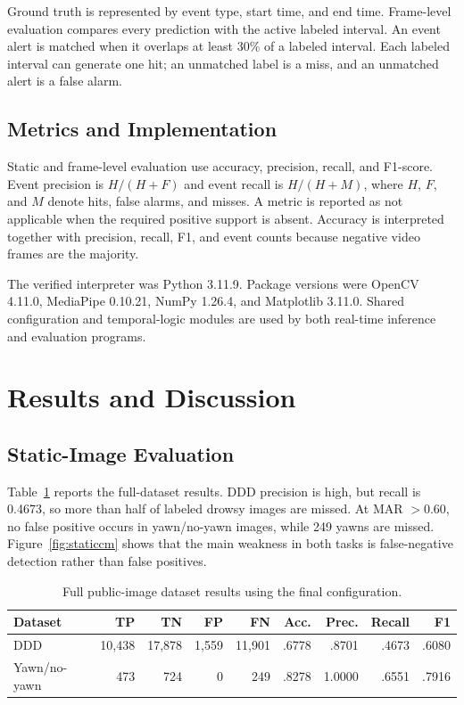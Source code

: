 \documentclass[runningheads]{llncs}
\begin{document}
Ground truth is represented by event type, start time, and end time. Frame-level
evaluation compares every prediction with the active labeled interval. An event
alert is matched when it overlaps at least 30\% of a labeled interval. Each
labeled interval can generate one hit; an unmatched label is a miss, and an
unmatched alert is a false alarm.

\subsection{Metrics and Implementation}

Static and frame-level evaluation use accuracy, precision, recall, and F1-score.
Event precision is $H/(H+F)$ and event recall is $H/(H+M)$, where $H$, $F$, and
$M$ denote hits, false alarms, and misses. A metric is reported as not applicable
when the required positive support is absent. Accuracy is interpreted together
with precision, recall, F1, and event counts because negative video frames are
the majority.

The verified interpreter was Python 3.11.9. Package versions were OpenCV
4.11.0, MediaPipe 0.10.21, NumPy 1.26.4, and Matplotlib 3.11.0. Shared
configuration and temporal-logic modules are used by both real-time inference
and evaluation programs.

\section{Results and Discussion}

\subsection{Static-Image Evaluation}

Table~\ref{tab:static} reports the full-dataset results. DDD precision is high,
but recall is 0.4673, so more than half of labeled drowsy images are missed. At
MAR $>0.60$, no false positive occurs in yawn/no-yawn images, while 249 yawns
are missed. Figure~\ref{fig:staticcm} shows that the main weakness in both tasks
is false-negative detection rather than false positives.

\begin{table}[t]
\caption{Full public-image dataset results using the final configuration.}
\label{tab:static}
\centering
\scriptsize
\setlength{\tabcolsep}{3.4pt}
\begin{tabular}{@{}lrrrrrrrr@{}}
\toprule
Dataset & TP & TN & FP & FN & Acc. & Prec. & Recall & F1 \\
\midrule
DDD & 10,438 & 17,878 & 1,559 & 11,901 & .6778 & .8701 & .4673 & .6080 \\
Yawn/no-yawn & 473 & 724 & 0 & 249 & .8278 & 1.0000 & .6551 & .7916 \\
\bottomrule
\end{tabular}
\end{table}
\end{document}
